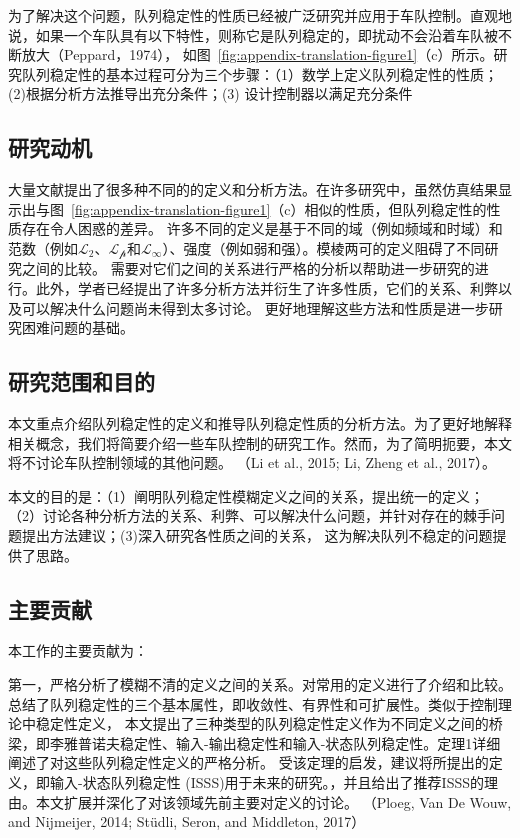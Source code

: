 \begin{translation}
  为了解决这个问题，队列稳定性的性质已经被广泛研究并应用于车队控制。直观地说，如果一个车队具有以下特性，则称它是队列稳定的，即扰动不会沿着车队被不断放大（Peppard，1974），
  如图~\ref{fig:appendix-translation-figure1}（c）所示。研究队列稳定性的基本过程可分为三个步骤：（1）数学上定义队列稳定性的性质；(2)根据分析方法推导出充分条件；(3) 设计控制器以满足充分条件

\subsection{研究动机}

  大量文献提出了很多种不同的的定义和分析方法。在许多研究中，虽然仿真结果显示出与图~\ref{fig:appendix-translation-figure1}（c）相似的性质，但队列稳定性的性质存在令人困惑的差异。
  许多不同的定义是基于不同的域（例如频域和时域）和范数（例如$\mathcal{L_2}$、$\mathcal{L_p}$和$\mathcal{L_\infty}$）、强度（例如弱和强）。模棱两可的定义阻碍了不同研究之间的比较。
  需要对它们之间的关系进行严格的分析以帮助进一步研究的进行。此外，学者已经提出了许多分析方法并衍生了许多性质，它们的关系、利弊以及可以解决什么问题尚未得到太多讨论。
  更好地理解这些方法和性质是进一步研究困难问题的基础。

\subsection{研究范围和目的}

本文重点介绍队列稳定性的定义和推导队列稳定性质的分析方法。为了更好地解释相关概念，我们将简要介绍一些车队控制的研究工作。然而，为了简明扼要，本文将不讨论车队控制领域的其他问题。
（Li et al., 2015; Li, Zheng et al., 2017）。

本文的目的是：（1）阐明队列稳定性模糊定义之间的关系，提出统一的定义； （2）讨论各种分析方法的关系、利弊、可以解决什么问题，并针对存在的棘手问题提出方法建议；(3)深入研究各性质之间的关系，
这为解决队列不稳定的问题提供了思路。

\subsection{主要贡献}

  本工作的主要贡献为：

  第一，严格分析了模糊不清的定义之间的关系。对常用的定义进行了介绍和比较。总结了队列稳定性的三个基本属性，即收敛性、有界性和可扩展性。类似于控制理论中稳定性定义，
  本文提出了三种类型的队列稳定性定义作为不同定义之间的桥梁，即李雅普诺夫稳定性、输入-输出稳定性和输入-状态队列稳定性。定理1详细阐述了对这些队列稳定性定义的严格分析。
  受该定理的启发，建议将所提出的定义，即输入-状态队列稳定性 (ISSS)用于未来的研究。，并且给出了推荐ISSS的理由。本文扩展并深化了对该领域先前主要对定义的讨论。
  （Ploeg, Van De Wouw, and Nijmeijer, 2014; Stüdli, Seron, and Middleton, 2017）


\end{translation}
